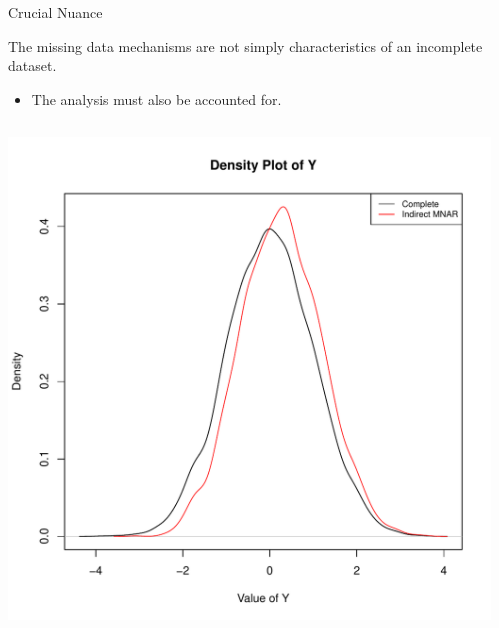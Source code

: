 \documentclass{beamer}\usepackage[]{graphicx}\usepackage[]{color}
\newenvironment{knitrout}{}{} %
\begin{document}
\begin{frame}{Crucial Nuance}
  
  The missing data mechanisms are not simply characteristics of an incomplete 
  dataset.
  \begin{itemize}
  \item The analysis must also be accounted for.
  \end{itemize}
  
  \begin{columns}
    \begin{column}{0.5\textwidth}
      
\begin{knitrout}\footnotesize
{}\color{fgcolor}

{\centering \includegraphics[width=1\linewidth]{figure/unnamed-chunk-15-1} 

}



\end{knitrout}

\end{column}
\begin{column}{0.5\textwidth}
  
\begin{knitrout}\footnotesize
{}\color{fgcolor}


\end{knitrout}
\end{column}
\end{columns}
\end{frame}
\end{document}
